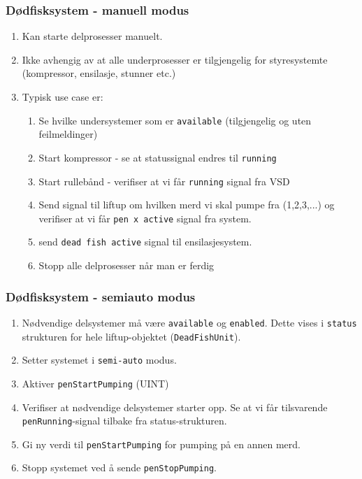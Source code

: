 \documentclass{beamer}
\begin{document}
\begin{frame}
  \frametitle{Dødfisksystem - manuell modus}
  \begin{enumerate}
    \vspace{0pt} %
    \item<1-> Kan starte delprosesser manuelt.
    \item<2-> Ikke avhengig av at alle underprosesser er tilgjengelig for styresystemte (kompressor, ensilasje, stunner etc.)
    \item<3-> Typisk use case er:
    \begin{enumerate}
      \item<4-> Se hvilke undersystemer som er \texttt{available} (tilgjengelig og uten feilmeldinger)
      \item <5-> Start kompressor - se at statussignal endres til \texttt{running}
      \item <6-> Start rullebånd - verifiser at vi får \texttt{running} signal fra VSD
      \item <7-> Send signal til liftup om hvilken merd vi skal pumpe fra (1,2,3,...) og verifiser at vi får \texttt{pen x active} signal fra system.
      \item <8-> send \texttt{dead fish active} signal til ensilasjesystem.
      \item <9-> Stopp alle delprosesser når man er ferdig
    \end{enumerate}
    \end{enumerate}

\end{frame}

\begin{frame}
  \frametitle{Dødfisksystem - semiauto modus}
  \begin{enumerate}
    \vspace{0pt} %
    \item<1-> Nødvendige delsystemer må være \texttt{available} og \texttt{enabled}. Dette vises i \texttt{status} strukturen for hele liftup-objektet (\texttt{DeadFishUnit}).
    \item<2-> Setter systemet i \texttt{semi-auto} modus.
    \item<3-> Aktiver \texttt{penStartPumping} (UINT)
    \item<4-> Verifiser at nødvendige delsystemer starter opp. Se at vi får tilsvarende \texttt{penRunning}-signal tilbake fra status-strukturen.
    \item<5-> Gi ny verdi til \texttt{penStartPumping} for pumping på en annen merd.
    \item<6-> Stopp systemet ved å sende \texttt{penStopPumping}.
    \end{enumerate}
  \end{frame}
\end{document}
